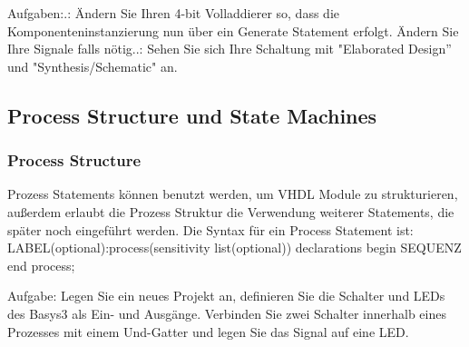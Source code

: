 \documentclass{article}
\begin{document}
Aufgaben:.: \"Andern Sie Ihren 4-bit Volladdierer so, dass die Komponenteninstanzierung nun \"uber ein Generate Statement erfolgt. \"Andern Sie Ihre Signale falls n\"otig..: Sehen Sie sich Ihre Schaltung mit "Elaborated Design'' und "Synthesis/Schematic" an.

\subsection{Process Structure und State Machines}
\subsubsection{Process Structure}
Prozess Statements k\"onnen benutzt werden, um VHDL Module zu strukturieren, au{\ss}erdem erlaubt die Prozess Struktur die Verwendung weiterer Statements, die sp\"ater noch eingef\"uhrt werden. Die Syntax f\"ur ein Process Statement ist:\newline
LABEL(optional):process(sensitivity list(optional))\newline
declarations\newline
begin\newline
SEQUENZ\newline
end process;\newline

Aufgabe:\newline
Legen Sie ein neues Projekt an, definieren Sie die Schalter und LEDs des Basys3 als Ein- und Ausg\"ange. Verbinden Sie zwei Schalter innerhalb eines Prozesses mit einem Und-Gatter und legen Sie das Signal auf eine LED.
\end{document}
